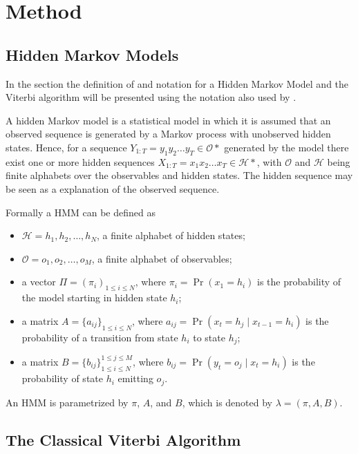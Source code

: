 \chapter{Method}
\label{cha:method}

\section{Hidden Markov Models}
\label{sec:hidden-markov-models}

In the section the definition of and notation for a Hidden Markov Model and the
Viterbi algorithm will be presented using the notation also used by
\citet{sand2013ziphmmlib}.

A hidden Markov model is a statistical model in which it is assumed that an
observed sequence is generated by a Markov process with unobserved hidden
states. Hence, for a sequence $Y_{1:T} = y_1y_2\dots{}y_T \in \mathcal{O*}$
generated by the model there exist one or more hidden sequences
$X_{1:T} = x_1x_2\dots{}x_T \in \mathcal{H*}$, with $\mathcal{O}$ and
$\mathcal{H}$ being finite alphabets over the observables and hidden
states. The hidden sequence may be seen as a explanation of the observed
sequence.

Formally a HMM can be defined as
\begin{itemize}
\item $\mathcal{H} = {h_1, h_2, \dots, h_N}$, a finite alphabet of hidden
  states;
\item $\mathcal{O} = {o_1, o_2, \dots, o_M}$, a finite alphabet of observables;
\item a vector $\Pi = {(\pi_i)}_{1 \le i \le N}$, where $\pi_i = \Pr(x_1 =
  h_i)$ is the probability of the model starting in hidden state $h_i$;
\item a matrix $A = {\{a_{ij}\}}_{1 \le i \le N}$, where $a_{ij} = \Pr(x_t
  = h_j \mid x_{t - 1} = h_i)$ is the probability of a transition from state
  $h_i$ to state $h_j$;
\item a matrix $B = {\{b_{ij}\}}_{1 \le i \le N}^{1 \le j \le M}$, where
  $b_{ij} = \Pr(y_t = o_j \mid x_t = h_i)$ is the probability of state
  $h_i$ emitting $o_j$.
\end{itemize}

An HMM is parametrized by $\pi$, $A$, and $B$, which is denoted by $\lambda =
(\pi, A, B)$.

\section{The Classical Viterbi Algorithm}
\label{sec:class-viterbi-algor}

